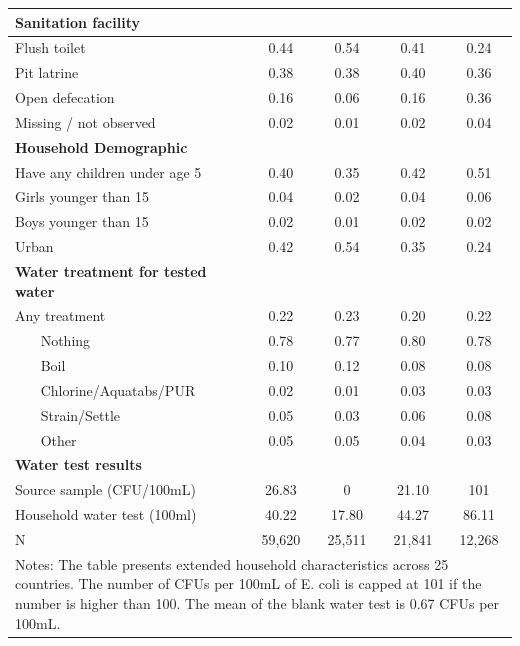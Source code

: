 \begin{table}[htbp]
\begin{tabular}{l*{4}{c}}
\textbf{Sanitation facility} \\\hline Flush toilet        &        0.44&        0.54&        0.41&        0.24\\
Pit latrine         &        0.38&        0.38&        0.40&        0.36\\
Open defecation     &        0.16&        0.06&        0.16&        0.36\\
Missing / not observed&        0.02&        0.01&        0.02&        0.04\\
\textbf{Household Demographic} \\\hline Have any children under age 5   &        0.40&        0.35&        0.42&        0.51\\
Girls younger than 15   &        0.04&        0.02&        0.04&        0.06\\
Boys younger than 15      &        0.02&        0.01&        0.02&        0.02\\
Urban               &        0.42&        0.54&        0.35&        0.24\\
\textbf{Water treatment for tested water} \\\hline Any treatment&        0.22&        0.23&        0.20&        0.22\\
~~~ Nothing      &        0.78&        0.77&        0.80&        0.78\\
~~~ Boil         &        0.10&        0.12&        0.08&        0.08\\
~~~ Chlorine/Aquatabs/PUR&        0.02&        0.01&        0.03&        0.03\\
~~~ Strain/Settle&        0.05&        0.03&        0.06&        0.08\\
~~~ Other        &        0.05&        0.05&        0.04&        0.03\\
\textbf{Water test results} \\\hline Source sample (CFU/100mL)&       26.83&        0&       21.10&      101\\
Household water test (100ml)&       40.22&       17.80&       44.27&       86.11\\
\hline
N                   &      59,620&      25,511&      21,841&      12,268\\
\hline\hline
\multicolumn{5}{p{0.96\linewidth}}{\footnotesize Notes: The table presents extended household characteristics across 25 countries. The number of CFUs per 100mL of E. coli is capped at 101 if the number is higher than 100. The mean of the blank water test is 0.67 CFUs per 100mL.}\\
\end{tabular}
\end{table}
